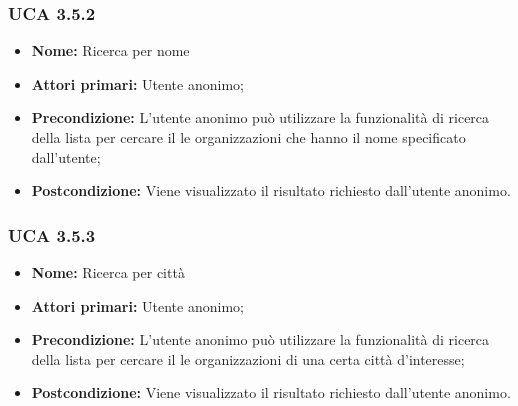 \subsubsection{UCA 3.5.2}%
\begin{itemize}
	\item \textbf{Nome:} Ricerca per nome
	\item \textbf{Attori primari:} Utente anonimo;
	\item \textbf{Precondizione:} L’utente anonimo può utilizzare la funzionalità di ricerca della lista per cercare il le organizzazioni che hanno il nome specificato dall’utente;
	\item \textbf{Postcondizione:} Viene visualizzato il risultato richiesto dall’utente anonimo.
\end{itemize}

\subsubsection{UCA 3.5.3}%
\begin{itemize}
	\item \textbf{Nome:} Ricerca per città
	\item \textbf{Attori primari:} Utente anonimo;
	\item \textbf{Precondizione:} L'utente anonimo può utilizzare la funzionalità di ricerca della lista per cercare il le organizzazioni di una certa città d’interesse;
	\item \textbf{Postcondizione:} Viene visualizzato il risultato richiesto dall’utente anonimo.
\end{itemize}

